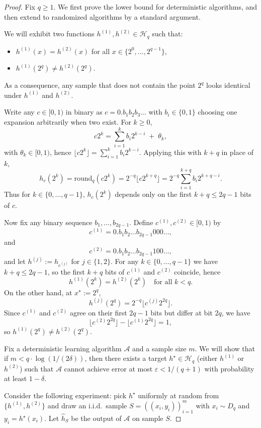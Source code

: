 \documentclass{article}
\newcommand{\cH}{\mathcal{H}}
\newcommand{\cA}{\mathcal{A}}
\theoremstyle{plain}
\theoremstyle{definition}
\theoremstyle{remark}
\begin{document}
\begin{proof}
	Fix $q\ge 1$. We first prove the lower bound for deterministic
	algorithms, and then extend to randomized algorithms by a standard
	argument.
	
	We will exhibit two functions $h^{(1)},h^{(2)}\in\cH_q$ such that:
	\begin{itemize}
		\item $h^{(1)}(x) = h^{(2)}(x)$ for all $x\in\{2^0,\dots,2^{q-1}\}$,
		\item $h^{(1)}(2^q) \ne h^{(2)}(2^q)$.
	\end{itemize}
	As a consequence, any sample that does not contain the point $2^q$
	looks identical under $h^{(1)}$ and $h^{(2)}$.
	
	Write any $c\in[0,1)$ in binary as
	$c = 0.b_1 b_2 b_3 \dots$ with $b_i\in\{0,1\}$ choosing one expansion arbitrarily when two exist. For $k\ge 0$,
	\[
	c 2^k
	= \sum_{i=1}^k b_i 2^{k-i} \;+\; \theta_k,
	\]
	with $\theta_k\in[0,1)$, hence
	$\lfloor c 2^k\rfloor = \sum_{i=1}^k b_i 2^{k-i}$. Applying this with
	$k+q$ in place of $k$,
	\[
	h_c(2^k)
	= \mathrm{round}_q(c 2^k)
	= 2^{-q}\bigl\lfloor c 2^{k+q}\bigr\rfloor
	= 2^{-q} \sum_{i=1}^{k+q} b_i 2^{k+q-i}.
	\]
	Thus for $k\in\{0,\dots,q-1\}$, $h_c(2^k)$ depends only on the first
	$k+q \le 2q-1$ bits of $c$.
	
	Now fix any binary sequence $b_1,\dots,b_{2q-1}$. Define
	$c^{(1)},c^{(2)}\in[0,1)$ by
	\[
	c^{(1)} = 0.b_1 b_2 \dots b_{2q-1} 0 0 0 \dots,
		\]
		and 
			\[
	c^{(2)} = 0.b_1 b_2 \dots b_{2q-1} 1 0 0 \dots,
	\]
	and let $h^{(j)} := h_{c^{(j)}}$ for $j\in\{1,2\}$. For any
	$k\in\{0,\dots,q-1\}$ we have $k+q \le 2q-1$, so the first $k+q$ bits
	of $c^{(1)}$ and $c^{(2)}$ coincide, hence
	\[
	h^{(1)}(2^k) = h^{(2)}(2^k) \quad\text{for all }k<q.
	\]
	On the other hand, at $x^\star:=2^q$,
	\[
	h^{(j)}(2^q)
	= 2^{-q} \bigl\lfloor c^{(j)} 2^{2q} \bigr\rfloor.
	\]
	Since $c^{(1)}$ and $c^{(2)}$ agree on their first $2q-1$ bits but
	differ at bit $2q$, we have
	\[
	\bigl\lfloor c^{(2)} 2^{2q} \bigr\rfloor
	- \bigl\lfloor c^{(1)} 2^{2q} \bigr\rfloor
	= 1,
	\]
	so $h^{(1)}(2^q)\ne h^{(2)}(2^q)$.
	
	Fix a deterministic learning algorithm $\cA$ and a sample size $m$. We
	will show that if $m < q \cdot \log(1/(2\delta))$, then there exists a
	target $h^\star\in\cH_q$ (either $h^{(1)}$ or $h^{(2)}$) such that
	$\cA$ cannot achieve error at most $\varepsilon<1/(q+1)$ with
	probability at least $1-\delta$.
	
	Consider the following experiment: pick $h^\star$ uniformly at random
	from $\{h^{(1)},h^{(2)}\}$ and draw an i.i.d.\ sample
	$S=((x_i,y_i))_{i=1}^m$ with $x_i\sim D_q$ and
	$y_i = h^\star(x_i)$. Let $\hat h_S$ be the output of $\cA$ on sample
	$S$.
	

\end{proof}
\end{document}

